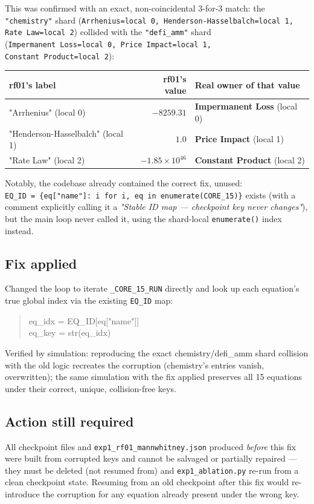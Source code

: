 \documentclass[11pt]{article}
\begin{document}
This was confirmed with an exact, non-coincidental 3-for-3 match: the
\texttt{"chemistry"} shard (\texttt{Arrhenius=local~0, Henderson-Hasselbalch=local~1,
Rate~Law=local~2}) collided with the \texttt{"defi\_amm"} shard
(\texttt{Impermanent~Loss=local~0, Price~Impact=local~1, Constant~Product=local~2}):

\begin{center}
\begin{tabular}{lrl}
\toprule
\textbf{rf01's label} & \textbf{rf01's value} & \textbf{Real owner of that value} \\
\midrule
"Arrhenius" (local 0)              & $-8259.31$            & \textbf{Impermanent Loss} (local 0) \\
"Henderson-Hasselbalch" (local 1)  & $1.0$                 & \textbf{Price Impact} (local 1) \\
"Rate Law" (local 2)               & $-1.85\times10^{46}$  & \textbf{Constant Product} (local 2) \\
\bottomrule
\end{tabular}
\end{center}

Notably, the codebase already contained the correct fix, unused:
\texttt{EQ\_ID~=~\{eq["name"]:~i~for~i,~eq~in~enumerate(CORE\_15)\}} exists (with a
comment explicitly calling it a \emph{"Stable ID map --- checkpoint key never
changes"}), but the main loop never called it, using the shard-local
\texttt{enumerate()} index instead.

\subsection*{Fix applied}
Changed the loop to iterate \texttt{\_CORE\_15\_RUN} directly and look up each
equation's true global index via the existing \texttt{EQ\_ID} map:
\begin{quote}
\ttfamily\small
eq\_idx = EQ\_ID[eq["name"]] \\
eq\_key = str(eq\_idx)
\end{quote}
Verified by simulation: reproducing the exact chemistry/defi\_amm shard
collision with the old logic recreates the corruption (chemistry's entries
vanish, overwritten); the same simulation with the fix applied preserves
all 15 equations under their correct, unique, collision-free keys.

\subsection*{Action still required}
All checkpoint files and \texttt{exp1\_rf01\_mannwhitney.json} produced
\emph{before} this fix were built from corrupted keys and cannot be
salvaged or partially repaired --- they must be deleted (not resumed
from) and \texttt{exp1\_ablation.py} re-run from a clean checkpoint state.
Resuming from an old checkpoint after this fix would re-introduce the
corruption for any equation already present under the wrong key.
\end{document}
